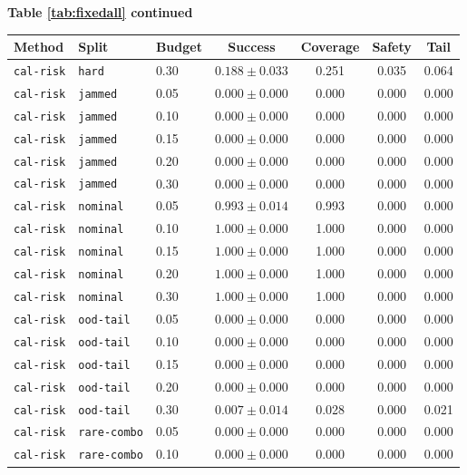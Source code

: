 \documentclass{article}
\begin{document}
\begin{center}
\textbf{Table \ref{tab:fixedall} continued}\\[0.4ex]
\begin{tabular}{lllcccc}
\toprule
Method & Split & Budget & Success & Coverage & Safety & Tail \\
\midrule
\texttt{cal-risk} & \texttt{hard} & 0.30 & $0.188 \pm 0.033$ & 0.251 & 0.035 & 0.064 \\
\texttt{cal-risk} & \texttt{jammed} & 0.05 & $0.000 \pm 0.000$ & 0.000 & 0.000 & 0.000 \\
\texttt{cal-risk} & \texttt{jammed} & 0.10 & $0.000 \pm 0.000$ & 0.000 & 0.000 & 0.000 \\
\texttt{cal-risk} & \texttt{jammed} & 0.15 & $0.000 \pm 0.000$ & 0.000 & 0.000 & 0.000 \\
\texttt{cal-risk} & \texttt{jammed} & 0.20 & $0.000 \pm 0.000$ & 0.000 & 0.000 & 0.000 \\
\texttt{cal-risk} & \texttt{jammed} & 0.30 & $0.000 \pm 0.000$ & 0.000 & 0.000 & 0.000 \\
\texttt{cal-risk} & \texttt{nominal} & 0.05 & $0.993 \pm 0.014$ & 0.993 & 0.000 & 0.000 \\
\texttt{cal-risk} & \texttt{nominal} & 0.10 & $1.000 \pm 0.000$ & 1.000 & 0.000 & 0.000 \\
\texttt{cal-risk} & \texttt{nominal} & 0.15 & $1.000 \pm 0.000$ & 1.000 & 0.000 & 0.000 \\
\texttt{cal-risk} & \texttt{nominal} & 0.20 & $1.000 \pm 0.000$ & 1.000 & 0.000 & 0.000 \\
\texttt{cal-risk} & \texttt{nominal} & 0.30 & $1.000 \pm 0.000$ & 1.000 & 0.000 & 0.000 \\
\texttt{cal-risk} & \texttt{ood-tail} & 0.05 & $0.000 \pm 0.000$ & 0.000 & 0.000 & 0.000 \\
\texttt{cal-risk} & \texttt{ood-tail} & 0.10 & $0.000 \pm 0.000$ & 0.000 & 0.000 & 0.000 \\
\texttt{cal-risk} & \texttt{ood-tail} & 0.15 & $0.000 \pm 0.000$ & 0.000 & 0.000 & 0.000 \\
\texttt{cal-risk} & \texttt{ood-tail} & 0.20 & $0.000 \pm 0.000$ & 0.000 & 0.000 & 0.000 \\
\texttt{cal-risk} & \texttt{ood-tail} & 0.30 & $0.007 \pm 0.014$ & 0.028 & 0.000 & 0.021 \\
\texttt{cal-risk} & \texttt{rare-combo} & 0.05 & $0.000 \pm 0.000$ & 0.000 & 0.000 & 0.000 \\
\texttt{cal-risk} & \texttt{rare-combo} & 0.10 & $0.000 \pm 0.000$ & 0.000 & 0.000 & 0.000 \\

\end{tabular}
\end{center}
\end{document}
